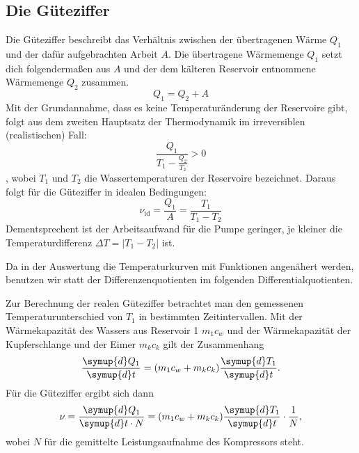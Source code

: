 \subsection{Die Güteziffer} \label{subsec:gueteziffer}
Die Güteziffer beschreibt das Verhältnis zwischen der übertragenen Wärme $Q_1$ und der dafür aufgebrachten Arbeit $A$.
Die übertragene Wärmemenge $Q_1$ setzt dich folgendermaßen aus $A$ und der dem kälteren Reservoir entnommene Wärmemenge $Q_2$ zusammen.
\begin{equation}
    Q_1 = Q_2 + A 
\end{equation}
Mit der Grundannahme, dass es keine Temperaturänderung der Reservoire gibt, folgt aus dem zweiten Hauptsatz der Thermodynamik im irreversiblen (realistischen) Fall:
\begin{equation}
    \frac{Q_1}{T_1 - \frac{Q_2}{T_2}} > 0
\end{equation}
, wobei $T_1$ und $T_2$ die Wassertemperaturen der Reservoire bezeichnet.
Daraus folgt für die Güteziffer in idealen Bedingungen:
\begin{equation}\label{eqn:idguete}
    \nu_{\text{id}} = \frac{Q_1}{A} = \frac{T_1}{T_1 - T_2}
\end{equation}
Dementsprechent ist der Arbeitsaufwand für die Pumpe geringer, je kleiner die Temperaturdifferenz $\Delta T = |T_1 - T_2|$ ist.

Da in der Auswertung die Temperaturkurven mit Funktionen angenähert werden, benutzen wir statt der Differenzenquotienten im folgenden Differentialquotienten.

Zur Berechnung der realen Güteziffer betrachtet man den gemessenen Temperaturunterschied von $T_1$ in bestimmten Zeitintervallen.
Mit der Wärmekapazität des Wassers aus Reservoir 1 $m_1c_w$ und der Wärmekapazität der Kupferschlange und der Eimer $m_kc_k$ gilt der Zusammenhang
\begin{equation}
    \frac{\symup{d}Q_1}{\symup{d}t} = (m_1c_w + m_kc_k) \frac{\symup{d}T_1}{\symup{d}t}.
\end{equation}
Für die Güteziffer ergibt sich dann 
\begin{equation}\label{eqn:gueteziffer}
    \nu = \frac{\symup{d}Q_1}{\symup{d}t \cdot N} = (m_1c_w + m_kc_k) \frac{\symup{d}T_1}{\symup{d}t} \cdot \frac{1}{N},
\end{equation}
wobei $N$ für die gemittelte Leistungsaufnahme des Kompressors steht.

